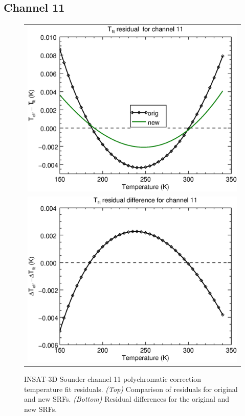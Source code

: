 \subsection{Channel 11}
\begin{figure}[H]
  \centering
  \begin{tabular}{c}
    \includegraphics[scale=0.55]{graphics/sndr/tfit/sndr_insat3d-11.tfit.eps} \\
    \includegraphics[scale=0.55]{graphics/sndr/tfit/sndr_insat3d-11.tfit.difference.eps}
  \end{tabular}
  \caption{INSAT-3D Sounder channel 11 polychromatic correction temperature fit residuals. \emph{(Top)} Comparison of residuals for original and new SRFs. \emph{(Bottom)} Residual differences for the original and new SRFs.}
  \label{fig:sndr_ch11_tfit}
\end{figure}

